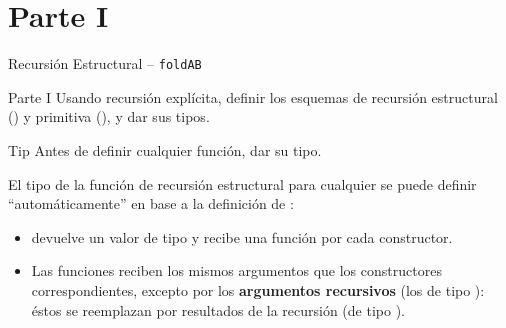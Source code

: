 \section{Parte I}

\begin{frame}{Recursión Estructural -- \texttt{foldAB}}
    \begin{exampleblock}{Parte I}
        Usando recursión explícita, definir los esquemas de recursión estructural () y primitiva (), y dar sus tipos.
    \end{exampleblock}

    \pause

    \begin{block}{Tip}
        Antes de definir cualquier función, \alert{dar su tipo}.
    \end{block}

    \pause

    El tipo de la función de recursión estructural  para cualquier  se puede definir ``automáticamente'' en base a la definición de :
    
    \pause

    \begin{itemize}[<+->]
        \item {} devuelve un valor de tipo  y recibe una función  por cada constructor.
        \item Las funciones reciben los mismos argumentos que los constructores correspondientes, excepto por los \textbf{argumentos recursivos} (los de tipo ): éstos se reemplazan por resultados de la recursión (de tipo ).
    \end{itemize}
\end{frame}


